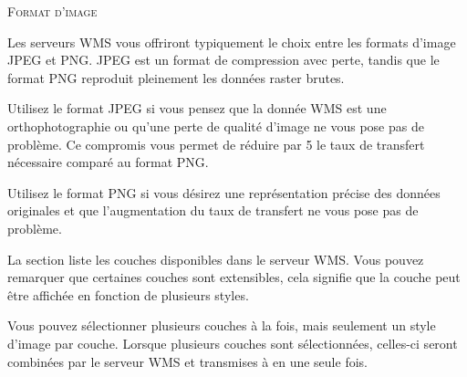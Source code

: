 \begin{Tip}[ht]\caption{\textsc{Format d'image}}

Les serveurs WMS vous offriront typiquement le choix entre les formats d'image JPEG et PNG. JPEG est un format de compression avec perte, tandis que le format PNG reproduit pleinement les données raster brutes.

Utilisez le format JPEG si vous pensez que la donnée WMS est une orthophotographie ou qu'une perte de qualité d'image ne vous pose pas de problème. Ce compromis vous permet de réduire par 5 le taux de transfert nécessaire comparé au  format PNG.

Utilisez le format PNG si vous désirez une représentation précise des données originales et que l'augmentation du taux de transfert ne vous pose pas de problème.
\end{Tip}

 \label{ogc-wms-layers}

La section  liste les couches disponibles dans le serveur WMS. Vous pouvez remarquer que certaines couches sont extensibles, cela signifie que la couche peut être affichée en fonction de plusieurs styles.

Vous pouvez sélectionner plusieurs couches à la fois, mais seulement un style  d'image par couche. Lorsque plusieurs couches sont sélectionnées, celles-ci  seront combinées par le serveur WMS et transmises à \qg en une seule fois.

